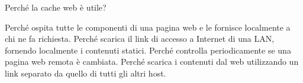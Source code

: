 \question
Perché la cache web è utile?

\begin{checkboxes}
	\choice Perché ospita tutte le componenti di una pagina web e le fornisce localmente a chi ne fa richiesta.
	\CorrectChoice Perché scarica il link di accesso a Internet di una LAN, fornendo localmente i contenuti statici.
	\choice Perché controlla periodicamente se una pagina web remota è cambiata.
	\choice Perché scarica i contenuti dal web utilizzando un link separato da quello di tutti gli altri host.
\end{checkboxes}
